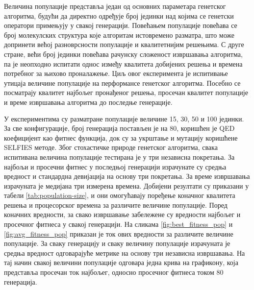\documentclass[12pt,oneside]{memoir}
\begin{document}
Величина популације представља један од основних параметара 
генетског алгоритма, будући да директно одређује број 
јединки над којима се генетски оператори примењују у 
свакој генерацији. Повећањем популације повећава се број 
молекулских структура које алгоритам истовремено разматра, 
што може допринети већој разноврсности популације и 
квалитетнијим решењима. С друге стране, већи број 
јединки повећава рачунску сложеност извршавања алгоритма, 
па је неопходно испитати однос између квалитета добијених 
решења и времена потребног за њихово проналажење.
Циљ овог експеримента је испитивање утицаја величине 
популације на перформансе генетског алгоритма. Посебно се 
посматрају квалитет најбољег пронађеног решења, 
просечан квалитет популације и време 
извршавања алгоритма до последње генерације.

У експериментима су разматране популације величине 15, 30, 
50 и 100 јединки. За све конфигурације, број генерација постављен
је на 80, коришћен је QED 
коефицијент као фитнес функција, док су за укрштање и 
мутацију коришћене SELFIES методе. 
Због стохастичке природе генетског алгоритма, 
свака испитивана величина популације тестирана је у 
три независна покретања. За најбољи и просечни фитнес 
у последњој генерацији израчунате су средња вредност и 
стандардна девијација на основу три покретања. 
За време извршавања израчуната је медијана три измерена 
времена. Добијени резултати су приказани у табели \ref{tab:population-size}, и
они омогућавају поређење коначног квалитета решења и 
процесорског времена за различите величине популације. 
Поред коначних вредности, за свако извршавање 
забележене су вредности најбољег и просечног фитнеса 
у свакој генерацији. На сликама 
\ref{fig:best_fitness_pop} и \ref{fig:avg_fitness_pop} 
приказан је ток ових вредности за различите величине 
популације. За сваку генерацију и сваку величину 
популације израчуната је средња вредност одговарајуће 
метрике на основу три независна извршавања. На тај 
начин свакој величини популације одговара једна крива 
на графикону, која представља просечан ток најбољег, 
односно просечног фитнеса током 80 генерација.
\end{document}

